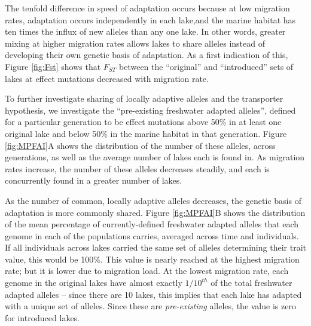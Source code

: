 \documentclass{article}
\begin{document}
The tenfold difference in speed of adaptation occurs because at low migration rates, adaptation occurs independently in each lake,and the marine habitat has ten times the influx of new alleles than any one lake. In other words, greater mixing at higher migration rates allows lakes to share alleles instead of developing their own genetic basis of adaptation. As a first indication of this, Figure \ref{fig:Fst} shows that $F_{ST}$ between the ``original'' and ``introduced'' sets of lakes at effect mutations decreased with migration rate.

To further investigate sharing of locally adaptive alleles and the transporter hypothesis, we investigate the ``pre-existing freshwater adapted alleles'',
defined for a particular generation to be effect mutations above 50\% in at least one original lake and below 50\% in the marine habitat in that generation.
Figure \ref{fig:MPFAI}A shows the distribution of the number of these alleles, across generations, as well as the average number of lakes each is found in. As migration rates increase, the number of these alleles decreases steadily, and each is concurrently found in a greater number of lakes.

As the number of common, locally adaptive alleles decreases, the genetic basis of adaptation is more commonly shared. Figure \ref{fig:MPFAI}B shows the distribution of the mean percentage of currently-defined freshwater adapted alleles that each genome in each of the populations carries, averaged across time and individuals. If all individuals across lakes carried the same set of alleles determining their trait value, this would be 100\%. This value is nearly reached at the highest migration rate; but it is lower due to migration load. At the lowest migration rate, each genome in the original lakes have almost exactly $1/10^{th}$ of the total freshwater adapted alleles -- since there are 10 lakes, this implies that each lake has adapted with a unique set of alleles. Since these are \emph{pre-existing} alleles, the value is zero for introduced lakes.
\end{document}
